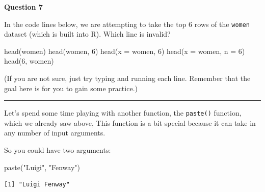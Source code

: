 \documentclass[
  letterpaper,
  DIV=11,
  numbers=noendperiod]{scrreprt}
\newenvironment{Shaded}{\begin{snugshade}}{\end{snugshade}}
\newcommand{\AttributeTok}[1]{\textcolor[rgb]{0.40,0.45,0.13}{#1}}
\newcommand{\DecValTok}[1]{\textcolor[rgb]{0.68,0.00,0.00}{#1}}
\newcommand{\FunctionTok}[1]{\textcolor[rgb]{0.28,0.35,0.67}{#1}}
\newcommand{\NormalTok}[1]{\textcolor[rgb]{0.00,0.23,0.31}{#1}}
\newcommand{\StringTok}[1]{\textcolor[rgb]{0.13,0.47,0.30}{#1}}
\begin{document}
\begin{tcolorbox}[enhanced jigsaw, title=\textcolor{quarto-callout-tip-color}{\faLightbulb}\hspace{0.5em}{Practice}, colbacktitle=quarto-callout-tip-color!10!white, leftrule=.75mm, arc=.35mm, opacityback=0, bottomrule=.15mm, rightrule=.15mm, toptitle=1mm, breakable, toprule=.15mm, colback=white, coltitle=black, colframe=quarto-callout-tip-color-frame, bottomtitle=1mm, titlerule=0mm, left=2mm, opacitybacktitle=0.6]

\textbf{Question 7}

In the code lines below, we are attempting to take the top 6 rows of the
\texttt{women} dataset (which is built into R). Which line is invalid?

\begin{Shaded}
\begin{Highlighting}[]
\FunctionTok{head}\NormalTok{(women)}
\FunctionTok{head}\NormalTok{(women, }\DecValTok{6}\NormalTok{)}
\FunctionTok{head}\NormalTok{(}\AttributeTok{x =}\NormalTok{ women, }\DecValTok{6}\NormalTok{)}
\FunctionTok{head}\NormalTok{(}\AttributeTok{x =}\NormalTok{ women, }\AttributeTok{n =} \DecValTok{6}\NormalTok{)}
\FunctionTok{head}\NormalTok{(}\DecValTok{6}\NormalTok{, women)}
\end{Highlighting}
\end{Shaded}

(If you are not sure, just try typing and running each line. Remember
that the goal here is for you to gain some practice.)

\end{tcolorbox}

\begin{center}\rule{0.5\linewidth}{0.5pt}\end{center}

Let's spend some time playing with another function, the
\texttt{paste()} function, which we already saw above, This function is
a bit special because it can take in any number of input arguments.

So you could have two arguments:

\begin{Shaded}
\begin{Highlighting}[]
\FunctionTok{paste}\NormalTok{(}\StringTok{"Luigi"}\NormalTok{, }\StringTok{"Fenway"}\NormalTok{)}
\end{Highlighting}
\end{Shaded}

\begin{verbatim}
[1] "Luigi Fenway"
\end{verbatim}
\end{document}
